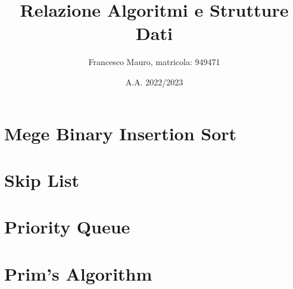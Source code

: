 \documentclass[letterpaper]{report}
\title{Relazione Algoritmi e Strutture Dati}
\author{Francesco Mauro, matricola: 949471}
\date{A.A. 2022/2023}
\begin{document}
\maketitle
\tableofcontents
\newpage
\chapter{Mege Binary Insertion Sort}

\chapter{Skip List}


\chapter{Priority Queue}

\chapter{Prim's Algorithm}

\end{document}
